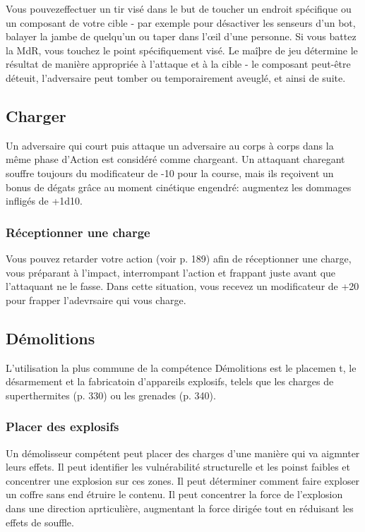 Vous pouvezeffectuer un tir visé dans le but de toucher un endroit spécifique ou un composant de votre cible - par exemple pour désactiver les senseurs d'un bot, balayer la jambe de quelqu'un ou taper dans l'œil d'une personne. Si vous battez la MdR, vous touchez le point spécifiquement visé. Le maîþre de jeu détermine le résultat de manière appropriée à l'attaque et à la cible - le composant peut-être déteuit, l'adversaire peut tomber ou temporairement aveuglé, et ainsi de suite. 

\subsection{Charger} \label{sec:charging} 

Un adversaire qui court puis attaque un adversaire au corps à corps dans la même phase d'Action est considéré comme chargeant. Un attaquant charegant souffre toujours du modificateur de -10 pour la course, mais ils reçoivent un bonus de dégats grâce au moment cinétique engendré: augmentez les dommages infligés de +1d10. 

\subsubsection{Réceptionner une charge} 

Vous pouvez retarder votre action (voir p. 189) afin de réceptionner une charge, vous préparant à l'impact, interrompant l'action et frappant juste avant que l'attaquant ne le fasse. Dans cette situation, vous recevez un modificateur de +20 pour frapper l'adevrsaire qui vous charge. 

\subsection{Démolitions} \label{sec:demolitions} 

L'utilisation la plus commune de la compétence Démolitions est le placemen t, le désarmement et la fabricatoin d'appareils explosifs, telels que les charges de superthermites (p. 330) ou les grenades (p. 340). 

\subsubsection{Placer des explosifs} 

Un démolisseur compétent peut placer des charges d'une manière qui va aigmnter leurs effets. Il peut identifier les vulnérabilité structurelle et les poinst faibles et concentrer une explosion sur ces zones. Il peut déterminer comment faire exploser un coffre sans end étruire le contenu. Il peut concentrer la force de l'explosion dans une direction aprticulière, augmentant la force dirigée tout en réduisant les effets de souffle. 

